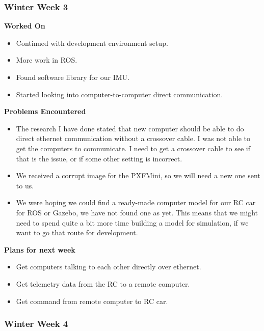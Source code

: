 \documentclass[compsoc,draftclsnofoot,onecolumn,10pt]{IEEEtran}
\begin{document}
\subsubsection*{Winter Week 3}

\textbf{Worked On}
\begin{itemize}
    \item Continued with development environment setup.
    \item More work in ROS.
    \item Found software library for our IMU.
    \item Started looking into computer-to-computer direct communication.
\end{itemize}

\textbf{Problems Encountered}
\begin{itemize}
    \item The research I have done stated that new computer should be able to do direct ethernet communication without a crossover cable. I was not able to get the computers to communicate. I need to get a crossover cable to see if that is the issue, or if some other setting is incorrect.
    \item We received a corrupt image for the PXFMini, so we will need a new one sent to us.
    \item We were hoping we could find a ready-made computer model for our RC car for ROS or Gazebo, we have not found one as yet. This means that we might need to spend quite a bit more time building a model for simulation, if we want to go that route for development.
\end{itemize}

\textbf{Plans for next week}
\begin{itemize}
    \item Get computers talking to each other directly over ethernet.
    \item Get telemetry data from the RC to a remote computer.
    \item Get command from remote computer to RC car.
\end{itemize}


\subsubsection*{Winter Week 4}
\end{document}
